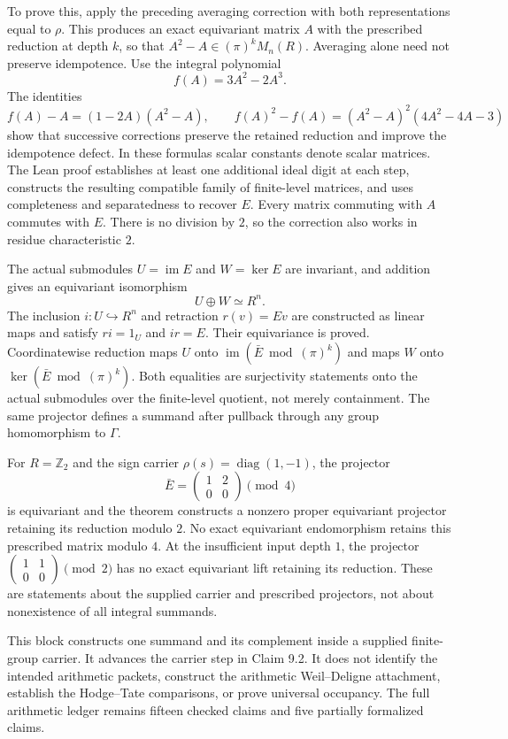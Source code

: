 \documentclass[11pt]{article}
\theoremstyle{definition}
\theoremstyle{remark}
\begin{document}
To prove this, apply the preceding averaging correction with both
representations equal to $\rho$. This produces an exact equivariant matrix
$A$ with the prescribed reduction at depth $k$, so that
$A^2-A\in(\pi)^kM_n(R)$. Averaging alone need not preserve idempotence.
Use the integral polynomial
\[
f(A)=3A^2-2A^3.
\]
The identities
\[
f(A)-A=(1-2A)(A^2-A),\qquad
f(A)^2-f(A)=(A^2-A)^2(4A^2-4A-3)
\]
show that successive corrections preserve the retained reduction and improve
the idempotence defect. In these formulas scalar constants denote scalar
matrices. The Lean proof establishes at least one additional ideal digit at
each step, constructs the resulting compatible family of finite-level matrices, and uses
completeness and separatedness to recover $E$. Every matrix commuting with
$A$ commutes with $E$. There is no division by $2$, so the correction also
works in residue characteristic $2$.

The actual submodules $U=\operatorname{im}E$ and $W=\ker E$ are invariant,
and addition gives an equivariant isomorphism
\[
U\oplus W\simeq R^n.
\]
The inclusion $i:U\hookrightarrow R^n$ and retraction $r(v)=Ev$ are
constructed as linear maps and satisfy $ri=1_U$ and $ir=E$. Their
equivariance is proved. Coordinatewise reduction maps $U$ onto
$\operatorname{im}(\bar E\bmod(\pi)^k)$ and maps $W$ onto
$\ker(\bar E\bmod(\pi)^k)$. Both equalities are surjectivity statements
onto the actual submodules over the finite-level quotient, not merely containment. The same
projector defines a summand after pullback through any group homomorphism
to $\Gamma$.

For $R=\mathbb Z_2$ and the sign carrier
$\rho(s)=\operatorname{diag}(1,-1)$, the projector
\[
\bar E=\begin{pmatrix}1&2\\0&0\end{pmatrix}\pmod4
\]
is equivariant and the theorem constructs a nonzero proper equivariant
projector retaining its reduction modulo $2$. No exact equivariant
endomorphism retains this prescribed matrix modulo $4$. At the insufficient
input depth $1$, the projector
$\left(\begin{smallmatrix}1&1\\0&0\end{smallmatrix}\right)\pmod2$
has no exact equivariant lift retaining its reduction. These are statements
about the supplied carrier and prescribed projectors, not about nonexistence
of all integral summands.

This block constructs one summand and its complement inside a supplied
finite-group carrier. It advances the carrier step in Claim 9.2. It does
not identify the intended arithmetic packets, construct the arithmetic
Weil--Deligne attachment, establish the Hodge--Tate comparisons, or prove
universal occupancy. The full arithmetic ledger remains fifteen checked
claims and five partially formalized claims.
\end{document}
